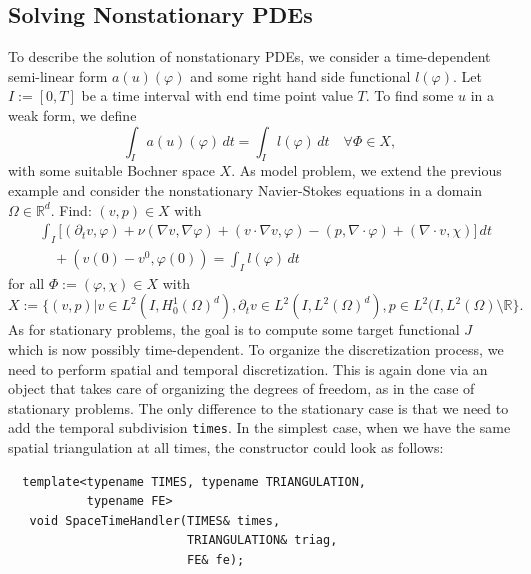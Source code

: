 \documentclass[smallextended]{svjour3}       %
\numberwithin{equation}{section}
\renewcommand{\phi}{\varphi}
\begin{document}
\subsection{Solving Nonstationary PDEs}\label{sec:timedep}
To describe the solution of nonstationary 
PDEs, we consider a time-dependent semi-linear form $a(u)(\phi)$ and some
right hand side functional $l(\phi)$.
Let $I:=[0,T]$ be a time interval with end time point value $T$.
To find some $u$ in a weak form, we define
\[
\int_I a(u)(\phi)\, dt = \int_I l(\phi)\, dt \quad \forall\Phi\in X,
\]
with some suitable Bochner space $X$.  As model problem,
we extend the previous example and consider the nonstationary Navier-Stokes equations
in a domain $\Omega\in\mathbb{R}^d$. Find: 
$(v,p)\in X$ with
\begin{align*}
&\int_I \bigl[ (\partial_t v, \phi)
+ \nu (\nabla v, \nabla \phi) + (v\cdot\nabla v, \phi)
- (p,\nabla\cdot \phi)
+ (\nabla\cdot v, \chi)\bigr] \, dt\\
&\quad + (v(0) - v^0, \phi(0))
= \int_I l(\phi) \, dt 
\end{align*}
for all $\Phi:= (\phi, \chi) \in X$ with
\[
X:= \bigl\{ 
(v,p) | v\in L^2(I,H_0^1(\Omega)^d) , 
\partial_t v\in L^2(I, L^2(\Omega)^d), 
p\in L^2(I,L^2(\Omega)\setminus\mathbb{R} \bigr\}.
\]
As for stationary problems, the goal is to compute
some target functional $J$ which is now possibly 
time-dependent. To organize the discretization 
process, we need to perform spatial and temporal 
discretization. This is again done via
an object that takes care of organizing the degrees of 
freedom, as in the case of stationary problems.
The only difference to the stationary case is that we need to 
add the temporal subdivision \texttt{times}. In the simplest 
case, when we have the same spatial triangulation 
at all times, the constructor could look as follows:
\begin{lstlisting}
  template<typename TIMES, typename TRIANGULATION, 
           typename FE>
   void SpaceTimeHandler(TIMES& times,
                         TRIANGULATION& triag,
                         FE& fe);
\end{lstlisting}
\end{document}

